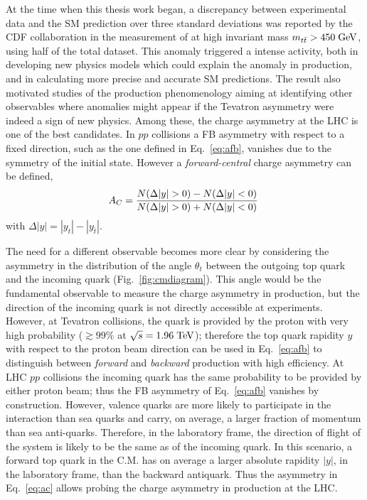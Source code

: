 At the time when this thesis work began, a discrepancy between
experimental data and the SM prediction over three standard deviations
was reported by the CDF collaboration in the measurement of \afb{} at
high \ttbar{} invariant mass $\mbox{$m_{t\bar{t}}$}{}>450\; \mathrm{GeV}{}$, using half of the
total dataset. This anomaly triggered a intense activity, both in
developing new physics models which could explain the anomaly in
\ttbar{} production, and in calculating more precise and accurate SM
predictions. The result also motivated studies of the \ttbar{}
production phenomenology aiming at identifying other observables where
anomalies might appear if the Tevatron asymmetry were indeed a
sign of new physics. Among these, the charge asymmetry at the LHC is
one of the best candidates. In $pp$ collisions a FB asymmetry with
respect to a fixed direction, such as the one defined in
Eq.~\ref{eq:afb}, vanishes due to the symmetry of the initial state.
However a {\it forward-central} charge asymmetry \ac{} can be defined, 
\begin{equation}
\label{eq:ac}
\ac{}=\frac{N(\Delta{}|y|>0)-N(\Delta{}|y|<0)}{N(\Delta{}|y|>0)+N(\Delta{}|y|<0)}
\phantom{,}
\end{equation}
with $\Delta{}|y|=|y_t| - |y_{\bar{t}}|$.

The need for a different observable becomes more clear by considering
the asymmetry in the distribution of the angle $\theta_t$ between the outgoing
top quark and the incoming quark (Fig.~\ref{fig:cmdiagram}). This angle
would be the fundamental observable to measure the charge asymmetry in
\ttbar{} production, but the direction of the incoming quark is
not directly accessible at experiments. However, at Tevatron \ppbar{}
collisions, the quark is provided by the proton with very high
probability ($\gtrsim{}99\%$ at $\sqrt{s}=1.96\; \mathrm{TeV}{}$); therefore the
top quark rapidity $y$ with respect to the proton beam direction can
be used in Eq.~\ref{eq:afb} to distinguish between {\it forward} and
{\it backward} production with high efficiency. At LHC $pp$ collisions
the incoming quark has the same probability to be provided by
either proton beam; thus the FB asymmetry of Eq.~\ref{eq:afb} vanishes by
construction. However, valence quarks are more likely to participate
in the interaction than sea quarks and carry, on average, a larger fraction of
momentum than sea anti-quarks. Therefore, in the laboratory frame, the
direction of flight of the \ttbar{} system is likely to be the same as of
the incoming quark. In this scenario, a forward top quark in
the \ttbar{} C.M. has on average a larger absolute rapidity $|y|$, in
the laboratory frame, than the backward antiquark. Thus the asymmetry
in Eq.~\ref{eq:ac} allows probing the charge asymmetry in \ttbar{}
production at the LHC.

